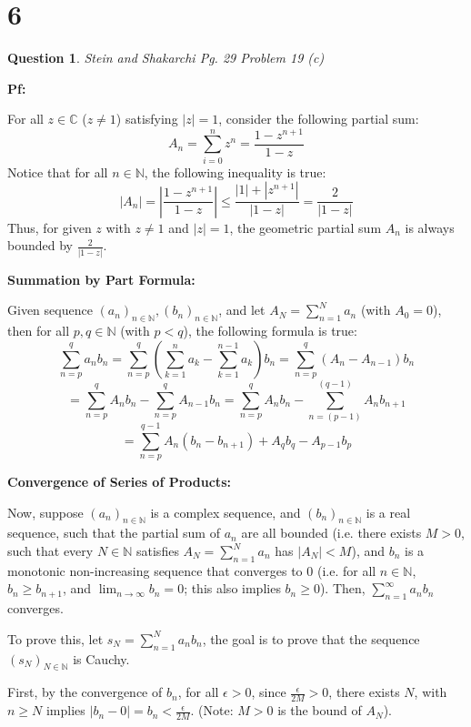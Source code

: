 \documentclass{article}
\newtheorem{question}{Question}
\begin{document}
\break

\section*{6}
\begin{question}
    Stein and Shakarchi Pg. 29 Problem 19 (c)
\end{question}

\textbf{Pf:}

For all $z\in\mathbb{C}$ ($z\neq 1$) satisfying $|z|=1$, consider the following partial sum:
$$A_n = \sum_{i=0}^{n}z^n = \frac{1-z^{n+1}}{1-z}$$
Notice that for all $n\in\mathbb{N}$, the following inequality is true:
$$|A_n|=\left|\frac{1-z^{n+1}}{1-z}\right|\leq \frac{|1|+|z^{n+1}|}{|1-z|} = \frac{2}{|1-z|}$$
Thus, for given $z$ with $z\neq 1$ and $|z|=1$, the geometric partial sum $A_n$ is always bounded by $\frac{2}{|1-z|}$.

\hfill

\textbf{Summation by Part Formula:}

Given sequence $(a_n)_{n\in\mathbb{N}},(b_n)_{n\in\mathbb{N}}$, and let $A_N=\sum_{n=1}^{N}a_n$ (with $A_0=0$),
then for all $p,q\in\mathbb{N}$ (with $p<q$), the following formula is true:
$$\sum_{n=p}^{q}a_nb_n = \sum_{n=p}^{q}\left(\sum_{k=1}^{n}a_k-\sum_{k=1}^{n-1}a_k\right)b_n = \sum_{n=p}^{q}(A_n-A_{n-1})b_n$$
$$ = \sum_{n=p}^{q}A_nb_n-\sum_{n=p}^{q}A_{n-1}b_n = \sum_{n=p}^{q}A_nb_n-\sum_{n=(p-1)}^{(q-1)}A_{n}b_{n+1} $$
$$ = \sum_{n=p}^{q-1}A_n(b_n-b_{n+1})+A_qb_q-A_{p-1}b_{p}$$

\hfill

\textbf{Convergence of Series of Products:}

Now, suppose $(a_n)_{n\in\mathbb{N}}$ is a complex sequence, and $(b_n)_{n\in\mathbb{N}}$ is a real sequence, such that the partial sum of $a_n$ are all bounded
(i.e. there exists $M>0$, such that every $N\in\mathbb{N}$ satisfies $A_N=\sum_{n=1}^{N}a_n$ has $|A_N|<M$), and $b_n$ is a monotonic 
non-increasing sequence that converges to $0$ (i.e. for all $n\in\mathbb{N}$, $b_n\geq b_{n+1}$, and $\lim_{n\rightarrow\infty}b_n=0$; this also implies $b_n\geq 0$). Then, $\sum_{n=1}^{\infty}a_nb_n$ converges.

\hfill

To prove this, let $s_N = \sum_{n=1}^{N}a_nb_n$, the goal is to prove that the sequence $(s_N)_{N\in\mathbb{N}}$ is Cauchy.

First, by the convergence of $b_n$, for all $\epsilon>0$, since $\frac{\epsilon}{2M}>0$, there exists $N$, with $n\geq N$ implies $|b_n-0|=b_n<\frac{\epsilon}{2M}$. (Note: $M>0$ is the bound of $A_N$).
\end{document}
